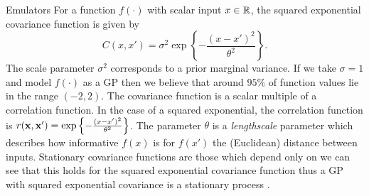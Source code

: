 \begin{chapter}{Emulators \label{Ch:Emulators}}
 For a function $f(\cdot)$ with scalar input $x \in \mathbb{R}$, the squared exponential covariance function is given by
\begin{equation}
  C(x, x') = \sigma^2 \exp\left\{ -\frac{(x - x')^2}{\theta^2} \right\}.
\end{equation}
The scale parameter $\sigma^2$ corresponds to a prior marginal variance. If we take $\sigma = 1$ and model $f(\cdot)$ as a GP then we believe that around $95\%$ of function values lie in the range $(-2, 2)$. The covariance function is a scalar multiple of a correlation function. In the case of a squared exponential, the correlation function is $r(\mathbf{x}, \mathbf{x}') = \exp\left\{  -\frac{(x - x')^2}{\theta^2} \right\}$. The parameter $\theta$ is a \textit{lengthscale} parameter which describes how informative $f(x)$ is for $f(x')$ the (Euclidean) distance between inputs. Stationary covariance functions are those which depend only on  we can see that this holds for the squared exponential covariance function thus a GP with squared exponential covariance is a stationary process \citep{Gneiting2002}.


\end{chapter}
